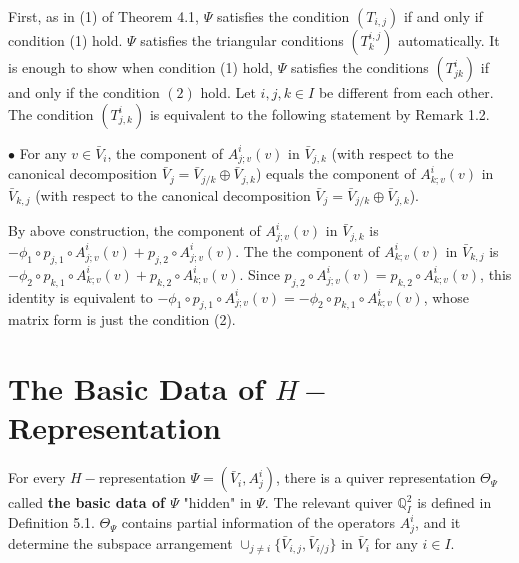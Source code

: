 \def\CTEXPreproc{Created by ctex v0.2.12, don't edit!}\documentclass[11pt]{article}
\begin{document}
\begin{pf}
First, as in (1) of Theorem 4.1,  $\Psi$ satisfies the condition $(T_{i,j})$ if and only if condition (1) hold. $\Psi$ satisfies
 the triangular conditions $(T^{i,j}_k )$ automatically.  It is enough to show when condition (1) hold, $\Psi$ satisfies the
 conditions $(T^{i}_{jk})$ if and only if the condition $(2)$ hold. Let $i,j,k\in I$ be different from each other. The condition $(T^i _{j,k})$ is equivalent to the following statement by Remark 1.2.

 \noindent $\bullet$ For any $v\in \bar{V}_i$, the component of $A^i _{j;v} (v)$ in $\bar{V}_{j,k}$ (with respect to the canonical decomposition
 $\bar{V}_j = \bar{V}_{j/k} \oplus \bar{V}_{j,k}$) equals the component of $A^i _{k;v} (v)$ in $\bar{V}_{k,j}$ (with respect to the canonical decomposition $\bar{V}_j = \bar{V}_{j/k} \oplus \bar{V}_{j,k}$).

 By above construction, the component of $A^i _{j;v} (v)$ in $\bar{V}_{j,k}$ is
 $- \phi_1 \circ p_{j,1} \circ A^i _{j;v} (v) + p_{j,2}\circ A^i _{j;v}(v) $. The the component of $A^i _{k;v} (v)$ in $\bar{V}_{k,j}$ is
 $- \phi_2 \circ p_{k,1} \circ A^i _{k;v} (v) + p_{k,2}\circ A^i _{k;v} (v) $. Since $p_{j,2}\circ A^i _{j;v} (v) =  p_{k,2}\circ A^i _{k;v} (v)$, this identity is equivalent to  $- \phi_1 \circ p_{j,1} \circ A^i _{j;v} (v)= - \phi_2 \circ p_{k,1} \circ A^i _{k;v} (v)$, whose matrix form is just the condition (2).\\

\end{pf}


























\section{The Basic Data of $H-$Representation }


For every $H-$representation $\Psi=( \bar{V}_i , A^i _j  )$, there is a quiver representation $\Theta_{\Psi}$ called \textbf{the basic data of $\Psi$}  "hidden" in $\Psi$. The relevant quiver $\mathbb{Q}^2 _I$ is defined in Definition 5.1. $\Theta_{\Psi}$ contains partial information of the operators $A^i _j$, and it determine the subspace arrangement $\cup_{j\neq i}\{ \bar{V}_{i,j}, \bar{V}_{i/j} \}$ in $\bar{V}_i$ for any $i\in I$.
\end{document}

